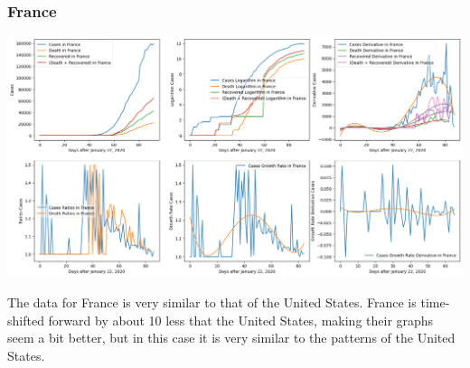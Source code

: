 \documentclass{report}
\begin{document}
            \subsubsection{France}
                \begin{center}
                    \includegraphics[width=\textwidth]{plots/france/analyze.png}
                \end{center}
                The data for France is very similar to that of the United States. France is time-shifted forward by about 10 less that the United States, making their graphs seem a bit better, but in this case it is very similar to the patterns of the United States.
\end{document}
